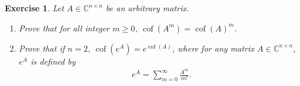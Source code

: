 \documentclass[11pt]{article}
\newtheorem{exercise}{Exercise}[section]
\theoremstyle{definition}
\numberwithin{equation}{subsection}
\begin{document}
\begin{exercise}{\rm *}
Let $A \in \mathbb{C}^{n \times n}$ be an arbitrary matrix.
\begin{enumerate}[label=(\alph*)]
    \item Prove that for all integer $m \geq 0$, $\operatorname{cof}\left(A^m\right) = \operatorname{cof}\left(A\right)^m$.
    
    \item Prove that if $n = 2$, $\operatorname{cof}\left(e^A\right) = e^{\operatorname{cof}(A)}$, where for any matrix $A \in \mathbb{C}^{n \times n}$, $e^A$ is defined by
    \begin{align*}
        e^A = \sum^\infty_{m=0} \frac{A^m}{m!}.
    \end{align*}
\end{enumerate}
\end{exercise}
\end{document}
